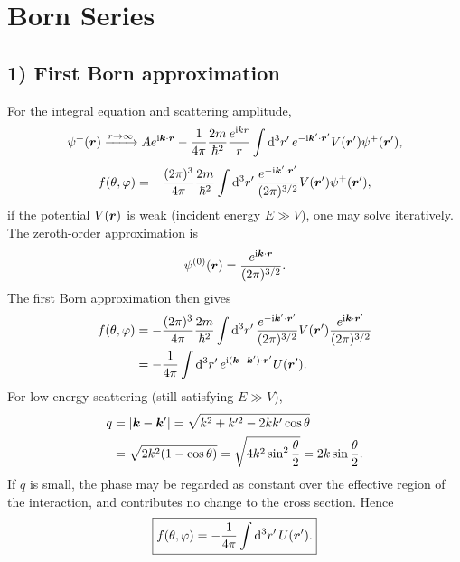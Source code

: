 \section{Born Series}
\subsection*{1) First Born approximation}
For the integral equation and scattering amplitude,
\begin{equation}
\psi^+(\bm{r})\xrightarrow{r\to\infty}
Ae^{\mathrm{i}\bm{k}\cdot\bm{r}}
-\frac1{4\pi}\frac{2m}{\hbar^2}\frac{e^{\mathrm{i} kr}}r
\int\mathrm{d}^3r'\,e^{-\mathrm{i}\bm{k}'\cdot\bm{r}'}
V(\bm{r}')\psi^+(\bm{r}'),
\end{equation}
\begin{equation}
f(\theta,\varphi)=-\frac{(2\pi)^3}{4\pi}\frac{2m}{\hbar^2}
\int\mathrm{d}^3r'\,\frac{e^{-\mathrm{i}\bm{k}'\cdot\bm{r}'}}{(2\pi)^{3/2}}
V(\bm{r}')\psi^+(\bm{r}'),
\end{equation}
if the potential $V(\bm{r})$ is weak (incident energy $E\gg V$), one may solve iteratively. The zeroth-order approximation is
\begin{equation}
\psi^{(0)}(\bm{r})=\frac{e^{\mathrm{i}\bm{k}\cdot\bm{r}}}{(2\pi)^{3/2}}.
\end{equation}
The first Born approximation then gives
\begin{equation}\begin{aligned}
f(\theta,\varphi)
&=-\frac{(2\pi)^3}{4\pi}\frac{2m}{\hbar^2}
\int\mathrm{d}^3r'\,\frac{e^{-\mathrm{i}\bm{k}'\cdot\bm{r}'}}{(2\pi)^{3/2}}
V(\bm{r}')\frac{e^{\mathrm{i}\bm{k}\cdot\bm{r}'}}{(2\pi)^{3/2}}\\
&=-\frac1{4\pi}\int\mathrm{d}^3r'\,
 e^{\mathrm{i}(\bm{k}-\bm{k}')\cdot\bm{r}'}U(\bm{r}').
\end{aligned}\end{equation}
For low-energy scattering (still satisfying $E\gg V$),
\begin{equation}\begin{aligned}
q&=|\bm{k}-\bm{k}'|=
\sqrt{k^2+k'^2-2kk'\cos\theta}\\
&=\sqrt{2k^2(1-\cos\theta)}
=\sqrt{4k^2\sin^2\frac\theta2}=2k\sin\frac\theta2.
\end{aligned}\end{equation}
If $q$ is small, the phase may be regarded as constant over the effective region of the interaction, and contributes no change to the cross section. Hence
\begin{equation}
\boxed{f(\theta,\varphi)=-\frac1{4\pi}\int\mathrm{d}^3r'\,U(\bm{r}').}
\end{equation}

